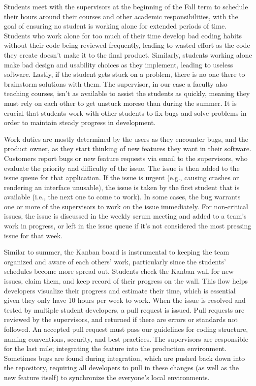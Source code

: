 Students meet with the supervisors at the beginning of the Fall term to schedule their hours around their courses and other academic responsibilities, with the goal of ensuring no student is working alone for extended periods of time. Students who work alone for too much of their time develop bad coding habits without their code being reviewed frequently, leading to wasted effort as the code they create doesn't make it to the final product. Similarly, students working alone make bad design and usability choices as they implement, leading to useless software. Lastly, if the student gets stuck on a problem, there is no one there to brainstorm solutions with them. The supervisor, in our case a faculty also teaching courses, isn't as available to assist the students as quickly, meaning they must rely on each other to get unstuck moreso than during the summer. It is crucial that students work with other students to fix bugs and solve problems in order to maintain steady progress in development.

Work duties are mostly determined by the users as they encounter bugs, and the product owner, as they start thinking of new features they want in their software. Customers report bugs or new feature requests via email to the supervisors, who evaluate the priority and difficulty of the issue. The issue is then added to the issue queue for that application. If the issue is urgent (e.g., causing crashes or rendering an interface unusable), the issue is taken by the first student that is available (i.e., the next one to come to work). In some cases, the bug warrants one or more of the supervisors to work on the issue immediately. For non-critical issues, the issue is discussed in the weekly scrum meeting and added to a team's work in progress, or left in the issue queue if it's not considered the most pressing issue for that week. 

Similar to summer, the Kanban board is instrumental to keeping the team organized and aware of each others' work, particularly since the students' schedules become more spread out. Students check the Kanban wall for new issues, claim them, and keep record of their progress on the wall. This flow helps developers visualize their progress and estimate their time, which is essential given they only have 10 hours per week to work. When the issue is resolved and tested by multiple student developers, a pull request is issued. Pull requests are reviewed by the supervisors, and returned if there are errors or standards not followed. An accepted pull request must pass our guidelines for coding structure, naming conventions, security, and best practices. The supervisors are responsible for the last mile; integrating the feature into the production environment. Sometimes bugs are found during integration, which are pushed back down into the repository, requiring all developers to pull in these changes (as well as the new feature itself) to synchronize the everyone's local environments. 

